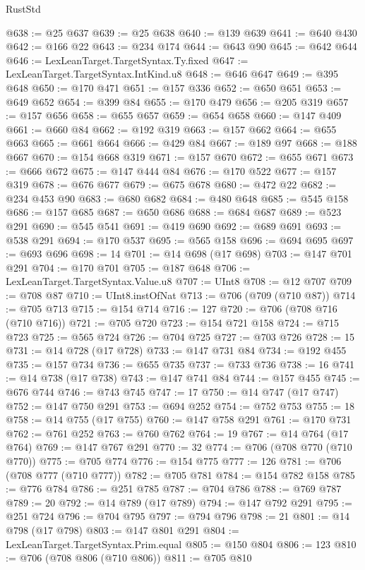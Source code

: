 \begin{lexlean}{RustStd}
\begin{coremodule}
{\begin{coremodule}
{{{{{{{{{{{{{{{{{{{{{{{{{{{{{{{{{{{{{{{@638 := @25 @637
@639 := @25 @638
@640 := @139 @639
@641 := @640 @430
@642 := @166 @22
@643 := @234 @174
@644 := @643 @90
@645 := @642 @644
@646 := LexLeanTarget.TargetSyntax.Ty.fixed
@647 := LexLeanTarget.TargetSyntax.IntKind.u8
@648 := @646 @647
@649 := @395 @648
@650 := @170 @471
@651 := @157 @336
@652 := @650 @651
@653 := @649 @652
@654 := @399 @84
@655 := @170 @479
@656 := @205 @319
@657 := @157 @656
@658 := @655 @657
@659 := @654 @658
@660 := @147 @409
@661 := @660 @84
@662 := @192 @319
@663 := @157 @662
@664 := @655 @663
@665 := @661 @664
@666 := @429 @84
@667 := @189 @97
@668 := @188 @667
@670 := @154 @668 @319
@671 := @157 @670
@672 := @655 @671
@673 := @666 @672
@675 := @147 @444 @84
@676 := @170 @522
@677 := @157 @319
@678 := @676 @677
@679 := @675 @678
@680 := @472 @22
@682 := @234 @453 @90
@683 := @680 @682
@684 := @480 @648
@685 := @545 @158
@686 := @157 @685
@687 := @650 @686
@688 := @684 @687
@689 := @523 @291
@690 := @545 @541
@691 := @419 @690
@692 := @689 @691
@693 := @538 @291
@694 := @170 @537
@695 := @565 @158
@696 := @694 @695
@697 := @693 @696
@698 := 14
@701 := @14 @698 (@17 @698)
@703 := @147 @701 @291
@704 := @170 @701
@705 := @187 @648
@706 := LexLeanTarget.TargetSyntax.Value.u8
@707 := UInt8
@708 := @12 @707
@709 := @708 @87
@710 := UInt8.instOfNat
@713 := @706 (@709 (@710 @87))
@714 := @705 @713
@715 := @154 @714
@716 := 127
@720 := @706 (@708 @716 (@710 @716))
@721 := @705 @720
@723 := @154 @721 @158
@724 := @715 @723
@725 := @565 @724
@726 := @704 @725
@727 := @703 @726
@728 := 15
@731 := @14 @728 (@17 @728)
@733 := @147 @731 @84
@734 := @192 @455
@735 := @157 @734
@736 := @655 @735
@737 := @733 @736
@738 := 16
@741 := @14 @738 (@17 @738)
@743 := @147 @741 @84
@744 := @157 @455
@745 := @676 @744
@746 := @743 @745
@747 := 17
@750 := @14 @747 (@17 @747)
@752 := @147 @750 @291
@753 := @694 @252
@754 := @752 @753
@755 := 18
@758 := @14 @755 (@17 @755)
@760 := @147 @758 @291
@761 := @170 @731
@762 := @761 @252
@763 := @760 @762
@764 := 19
@767 := @14 @764 (@17 @764)
@769 := @147 @767 @291
@770 := 32
@774 := @706 (@708 @770 (@710 @770))
@775 := @705 @774
@776 := @154 @775
@777 := 126
@781 := @706 (@708 @777 (@710 @777))
@782 := @705 @781
@784 := @154 @782 @158
@785 := @776 @784
@786 := @251 @785
@787 := @704 @786
@788 := @769 @787
@789 := 20
@792 := @14 @789 (@17 @789)
@794 := @147 @792 @291
@795 := @251 @724
@796 := @704 @795
@797 := @794 @796
@798 := 21
@801 := @14 @798 (@17 @798)
@803 := @147 @801 @291
@804 := LexLeanTarget.TargetSyntax.Prim.equal
@805 := @150 @804
@806 := 123
@810 := @706 (@708 @806 (@710 @806))
@811 := @705 @810
}}}}}}}}}}}}}}}}}}}}}}}}}}}}}}}}}}}}}}}
\end{coremodule}}
\end{coremodule}
\end{lexlean}
